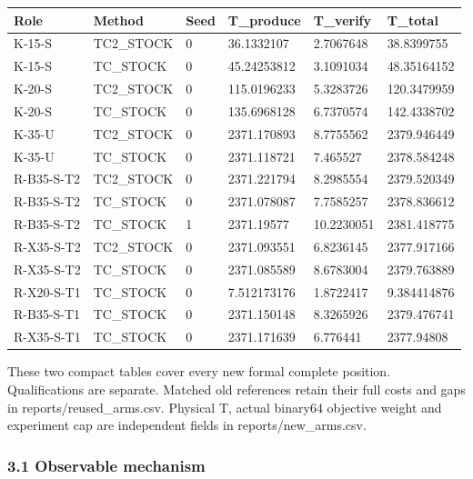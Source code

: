 \documentclass[
  american,
  11pt,
]{article}
\newcounter{none} %
\begin{document}

{\def\LTcaptype{none} %
\begin{longtable}[]{@{}llllll@{}}
\toprule\noalign{}
Role & Method & Seed & T\_\allowbreak{}produce & T\_\allowbreak{}verify & T\_\allowbreak{}total \\
\midrule\noalign{}
\endhead
\bottomrule\noalign{}
\endlastfoot
K-15-S & TC2\_\allowbreak{}STOCK & 0 & 36.1332107 & 2.7067648 & 38.8399755 \\
K-15-S & TC\_\allowbreak{}STOCK & 0 & 45.24253812 & 3.1091034 & 48.35164152 \\
K-20-S & TC2\_\allowbreak{}STOCK & 0 & 115.0196233 & 5.3283726 & 120.3479959 \\
K-20-S & TC\_\allowbreak{}STOCK & 0 & 135.6968128 & 6.7370574 & 142.4338702 \\
K-35-U & TC2\_\allowbreak{}STOCK & 0 & 2371.170893 & 8.7755562 & 2379.946449 \\
K-35-U & TC\_\allowbreak{}STOCK & 0 & 2371.118721 & 7.465527 & 2378.584248 \\
R-B35-S-T2 & TC2\_\allowbreak{}STOCK & 0 & 2371.221794 & 8.2985554 & 2379.520349 \\
R-B35-S-T2 & TC\_\allowbreak{}STOCK & 0 & 2371.078087 & 7.7585257 & 2378.836612 \\
R-B35-S-T2 & TC\_\allowbreak{}STOCK & 1 & 2371.19577 & 10.2230051 & 2381.418775 \\
R-X35-S-T2 & TC2\_\allowbreak{}STOCK & 0 & 2371.093551 & 6.8236145 & 2377.917166 \\
R-X35-S-T2 & TC\_\allowbreak{}STOCK & 0 & 2371.085589 & 8.6783004 & 2379.763889 \\
R-X20-S-T1 & TC\_\allowbreak{}STOCK & 0 & 7.512173176 & 1.8722417 & 9.384414876 \\
R-B35-S-T1 & TC\_\allowbreak{}STOCK & 0 & 2371.150148 & 8.3265926 & 2379.476741 \\
R-X35-S-T1 & TC\_\allowbreak{}STOCK & 0 & 2371.171639 & 6.776441 & 2377.94808 \\
\end{longtable}
}

These two compact tables cover every new formal complete position.
Qualifications are separate. Matched old references retain their full
costs and gaps in reports/reused\_\allowbreak{}arms.csv. Physical T, actual binary64
objective weight and experiment cap are independent fields in
reports/new\_\allowbreak{}arms.csv.

\subsubsection{3.1 Observable mechanism}\label{observable-mechanism}
\end{document}
